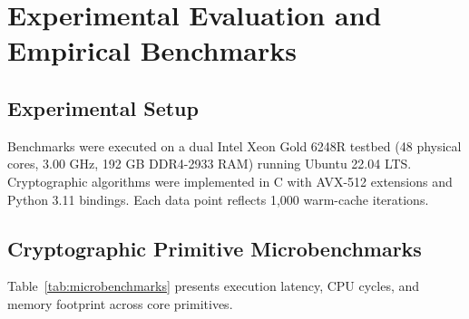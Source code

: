 \documentclass{llncs}
\begin{document}
\section{Experimental Evaluation and Empirical Benchmarks}
\subsection{Experimental Setup}
Benchmarks were executed on a dual Intel Xeon Gold 6248R testbed (48 physical cores, 3.00 GHz, 192 GB DDR4-2933 RAM) running Ubuntu 22.04 LTS. Cryptographic algorithms were implemented in C with AVX-512 extensions and Python 3.11 bindings. Each data point reflects 1,000 warm-cache iterations.

\subsection{Cryptographic Primitive Microbenchmarks}
Table~\ref{tab:microbenchmarks} presents execution latency, CPU cycles, and memory footprint across core primitives.
\end{document}
